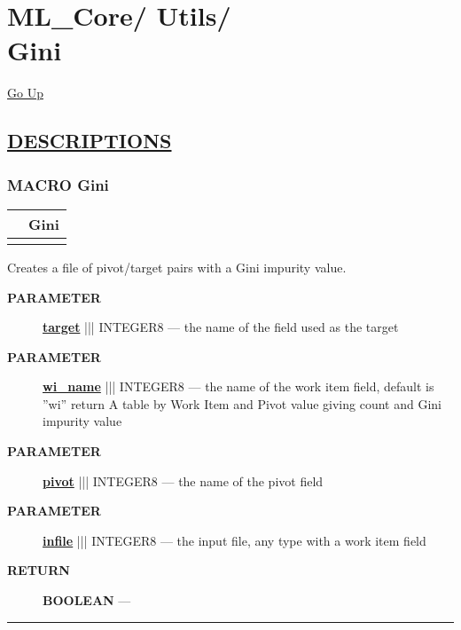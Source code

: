 \chapter*{\color{headfile}
{\large ML\_Core\slash\hspace{0pt}}
{\large Utils\slash\hspace{0pt}}
 \\
Gini
}
\hypertarget{ecldoc:toc:ML_Core.Utils.Gini}{}
\hyperlink{ecldoc:toc:root/ML_Core/Utils}{Go Up}


\section*{\underline{\textsf{DESCRIPTIONS}}}
\subsection*{\textsf{\colorbox{headtoc}{\color{white} MACRO}
Gini}}

\hypertarget{ecldoc:ml_core.utils.gini}{}

{\renewcommand{\arraystretch}{1.5}
\begin{tabularx}{\textwidth}{|>{\raggedright\arraybackslash}l|X|}
\hline
\hspace{0pt}\mytexttt{\color{red} } & \textbf{Gini} \\
\hline
\multicolumn{2}{|>{\raggedright\arraybackslash}X|}{\hspace{0pt}\mytexttt{\color{param} (infile, pivot, target, wi\_name='wi')}} \\
\hline
\end{tabularx}
}

\par





Creates a file of pivot/target pairs with a Gini impurity value.






\par
\begin{description}
\item [\colorbox{tagtype}{\color{white} \textbf{\textsf{PARAMETER}}}] \textbf{\underline{target}} ||| INTEGER8 --- the name of the field used as the target
\item [\colorbox{tagtype}{\color{white} \textbf{\textsf{PARAMETER}}}] \textbf{\underline{wi\_name}} ||| INTEGER8 --- the name of the work item field, default is ''wi'' return A table by Work Item and Pivot value giving count and Gini impurity value
\item [\colorbox{tagtype}{\color{white} \textbf{\textsf{PARAMETER}}}] \textbf{\underline{pivot}} ||| INTEGER8 --- the name of the pivot field
\item [\colorbox{tagtype}{\color{white} \textbf{\textsf{PARAMETER}}}] \textbf{\underline{infile}} ||| INTEGER8 --- the input file, any type with a work item field
\end{description}







\par
\begin{description}
\item [\colorbox{tagtype}{\color{white} \textbf{\textsf{RETURN}}}] \textbf{BOOLEAN} --- 
\end{description}




\rule{\linewidth}{0.5pt}

